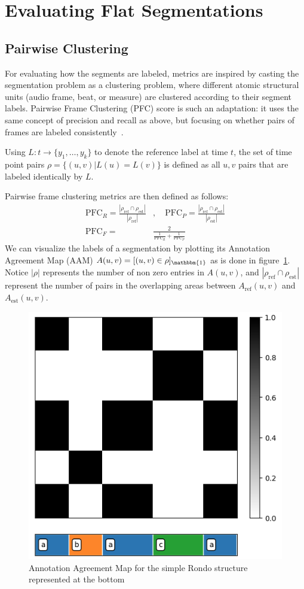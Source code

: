 
\section{Evaluating Flat Segmentations}
\subsection{Pairwise Clustering}
For evaluating how the segments are labeled, metrics are inspired by casting the segmentation problem as a clustering problem, where different atomic structural units (audio frame, beat, or measure) are clustered according to their segment labels.
Pairwise Frame Clustering (PFC) score is such an adaptation: it uses the same concept of precision and recall as above, but focusing on whether pairs of frames are labeled consistently~\cite{levy2008structural}.

Using $L: t \rightarrow \{y_1, \ldots, y_k\}$ to denote the reference label at time $t$, the set of time point pairs $\rho = \{(u, v)|L(u)=L(v)\}$ is defined as all $u, v$ pairs that are labeled identically by $L$.

Pairwise frame clustering metrics are then defined as follows: 
\begin{align*}
\text{PFC}_R = \frac{|\rho_\text{ref} \cap \rho_\text{est}|}{|\rho_\text{ref}|}&, \quad
\text{PFC}_P = \frac{|\rho_\text{ref} \cap \rho_\text{est}|}{|\rho_\text{est}|} \\
\text{PFC}_F = &\frac{2}{\frac1{\text{PFC}_R} + \frac1{\text{PFC}_P}}
\end{align*}
We can visualize the labels of a segmentation by plotting its Annotation Agreement Map (AAM) $A(u, v) = [(u, v) \in \rho]_\mathbbm{1}$ as is done in figure~\ref{fig:flat_anno_meet}.
Notice $|\rho|$ represents the number of non zero entries in $A(u, v)$, and $|\rho_\text{ref} \cap \rho_\text{est}|$ represent the number of pairs in the overlapping areas between $A_\text{ref}(u, v)$ and $A_\text{est}(u, v)$.

\begin{figure}
    \centering
    \includegraphics[width=0.5\linewidth]{content/figs/flat_anno_meet.png}
    \caption{Annotation Agreement Map for the simple Rondo structure represented at the bottom}
    \label{fig:flat_anno_meet}
\end{figure}

